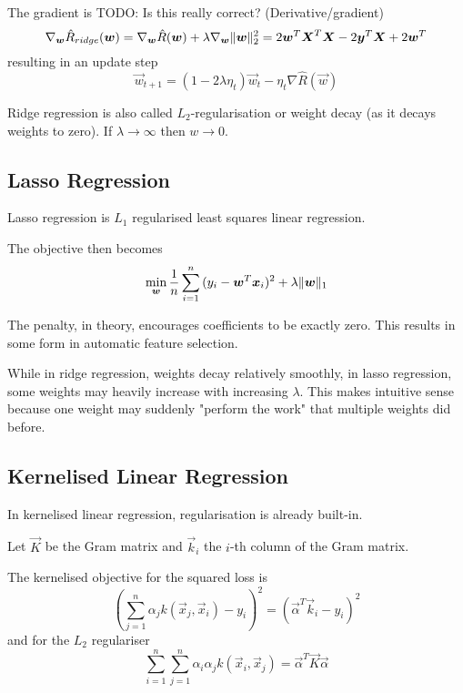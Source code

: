 The gradient is
TODO: Is this really correct? (Derivative/gradient)
\begin{equation*}
\nabla_{\boldsymbol{w}} \hat{R}_{ridge}(\boldsymbol{w})
= \nabla_{\boldsymbol{w}} \hat{R}(\boldsymbol{w})
+ \lambda \nabla_{\boldsymbol{w}} \lVert\boldsymbol{w}\rVert_2^2
= 2 \boldsymbol{w}^T \boldsymbol{X}^T \boldsymbol{X} - 2 \boldsymbol{y}^T \boldsymbol{X} + 2 \boldsymbol{w}^T
\end{equation*}
resulting in an update step
\begin{equation*}
\vec{w}_{t+1} =
(1 - 2\lambda \eta_t)\vec{w}_t - \eta_t \nabla \hat{R}(\vec{w})
\end{equation*}

Ridge regression is also called $L_2$-regularisation
or weight decay (as it decays weights to zero).
If $\lambda \to \infty$ then $w \to 0$.


\subsection{Lasso Regression}
Lasso regression is $L_1$ regularised
least squares linear regression.

The objective then becomes
\begin{equation*}
\min_{\boldsymbol{w}}{\frac{1}{n}
	\sum_{i=1}^n{(y_i - \boldsymbol{w}^T \boldsymbol{x}_i)^2
		+ \lambda \lVert\boldsymbol{w}\rVert_1
}}
\end{equation*}

The penalty, in theory, encourages coefficients to be
exactly zero.
This results in some form in automatic feature selection.

While in ridge regression, weights decay relatively smoothly,
in lasso regression, some weights may heavily increase
with increasing $\lambda$.
This makes intuitive sense because one weight may suddenly
"perform the work" that multiple weights did before.


\subsection{Kernelised Linear Regression}
In kernelised linear regression,
regularisation is already built-in.

Let $\vec{K}$ be the Gram matrix and $\vec{k}_i$ the
$i$-th column of the Gram matrix.

The kernelised objective for the squared loss is
\begin{equation*}
\left(\sum_{j=1}^n{\alpha_j k(\vec{x}_j, \vec{x}_i)} - y_i\right)^2
= (\vec{\alpha}^T \vec{k}_i - y_i)^2
\end{equation*}
and for the $L_2$ regulariser
\begin{equation*}
\sum_{i=1}^n{\sum_{j=1}^n{
		\alpha_i \alpha_j k(\vec{x}_i, \vec{x}_j)
}}
= \vec{\alpha}^T \vec{K} \vec{\alpha}
\end{equation*}

